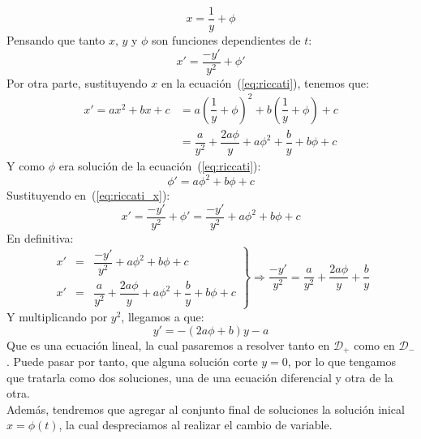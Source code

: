 \begin{equation*}
    x = \dfrac{1}{y} + \phi
\end{equation*}
Pensando que tanto $x$, $y$ y $\phi$ son funciones dependientes de $t$:
\begin{equation}\label{eq:riccati_x}
    x' = \dfrac{-y'}{y^2} + \phi'
\end{equation}
Por otra parte, sustituyendo $x$ en la ecuación~(\ref{eq:riccati}), tenemos que:
\begin{align*}
    x' = ax^2 + bx + c &= a{\left(\dfrac{1}{y}+\phi\right)}^{2} + b \left(\dfrac{1}{y}+\phi\right) + c \\
                       &= \dfrac{a}{y^2} + \dfrac{2a\phi}{y} + a\phi^2 + \dfrac{b}{y} + b\phi + c
\end{align*}
Y como $\phi$ era solución de la ecuación~(\ref{eq:riccati}):
\begin{equation*}
    \phi' = a\phi^2 + b\phi + c
\end{equation*}
Sustituyendo en~(\ref{eq:riccati_x}):
\begin{equation*}
    x' = \dfrac{-y'}{y^2} + \phi' = \dfrac{-y'}{y^2} + a\phi^2 + b\phi + c 
\end{equation*}
En definitiva:
\begin{equation*}
    \left.\begin{array}{rcl}
        x' &= &\dfrac{-y'}{y^2} + a\phi^2 + b\phi + c  \\
        x' &= &\dfrac{a}{y^2} + \dfrac{2a\phi}{y} + a\phi^2 + \dfrac{b}{y} + b\phi + c
    \end{array}\right\} \Longrightarrow \dfrac{-y'}{y^2} = \dfrac{a}{y^2} + \dfrac{2a\phi}{y} + \dfrac{b}{y}
\end{equation*}
Y multiplicando por $y^2$, llegamos a que:
\begin{equation*}
    y' = -(2a\phi+b) y - a
\end{equation*}
Que es una ecuación lineal, la cual pasaremos a resolver tanto en $\mathcal{D}_+$ como en $\mathcal{D}_-$. Puede pasar por tanto, que alguna solución corte $y=0$, por lo que tengamos que tratarla como dos soluciones, una de una ecuación diferencial y otra de la otra.\\

Además, tendremos que agregar al conjunto final de soluciones la solución inical $x=\phi(t)$, la cual despreciamos al realizar el cambio de variable.\\

